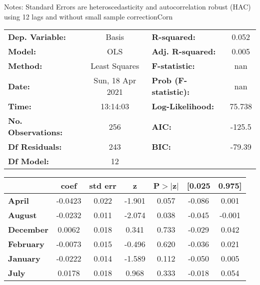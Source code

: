 Notes: \newline
 [1] Standard Errors are heteroscedasticity and autocorrelation robust (HAC) using 12 lags and without small sample correctionCorn\begin{center}
\begin{tabular}{lclc}
\toprule
\textbf{Dep. Variable:}    &      Basis       & \textbf{  R-squared:         } &     0.052   \\
\textbf{Model:}            &       OLS        & \textbf{  Adj. R-squared:    } &     0.005   \\
\textbf{Method:}           &  Least Squares   & \textbf{  F-statistic:       } &       nan   \\
\textbf{Date:}             & Sun, 18 Apr 2021 & \textbf{  Prob (F-statistic):} &      nan    \\
\textbf{Time:}             &     13:14:03     & \textbf{  Log-Likelihood:    } &    75.738   \\
\textbf{No. Observations:} &         256      & \textbf{  AIC:               } &    -125.5   \\
\textbf{Df Residuals:}     &         243      & \textbf{  BIC:               } &    -79.39   \\
\textbf{Df Model:}         &          12      & \textbf{                     } &             \\
\bottomrule
\end{tabular}
\begin{tabular}{lcccccc}
                   & \textbf{coef} & \textbf{std err} & \textbf{z} & \textbf{P$> |$z$|$} & \textbf{[0.025} & \textbf{0.975]}  \\
\midrule
\textbf{April}     &      -0.0423  &        0.022     &    -1.901  &         0.057        &       -0.086    &        0.001     \\
\textbf{August}    &      -0.0232  &        0.011     &    -2.074  &         0.038        &       -0.045    &       -0.001     \\
\textbf{December}  &       0.0062  &        0.018     &     0.341  &         0.733        &       -0.029    &        0.042     \\
\textbf{February}  &      -0.0073  &        0.015     &    -0.496  &         0.620        &       -0.036    &        0.021     \\
\textbf{January}   &      -0.0222  &        0.014     &    -1.589  &         0.112        &       -0.050    &        0.005     \\
\textbf{July}      &       0.0178  &        0.018     &     0.968  &         0.333        &       -0.018    &        0.054     \\

\end{tabular}
\end{center}
